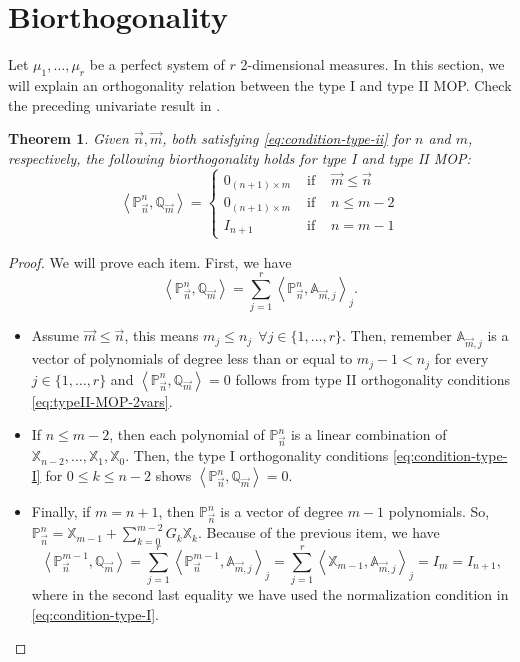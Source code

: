 \documentclass[12pt,a4]{article}
\theoremstyle{plain}
\newtheorem{theorem}{Theorem}[section]
\newcommand{\prodesc}[2]{\left\langle #1 , #2 \right\rangle}
\begin{document}
\section{Biorthogonality}

Let $\mu_1,\dots,\mu_r$ be a perfect system of $r$ 2-dimensional measures. In this section, we will explain an orthogonality relation between the type I and type II MOP. Check the preceding univariate result in \cite[Theorem 23.1.6]{Ismail}.

\begin{theorem}
    \label{th:biorthogonality}
    Given $\vec n, \vec m$, both satisfying \eqref{eq:condition-type-ii} for $n$ and $m$, respectively, the following biorthogonality holds for type I and type II MOP:
    \begin{equation}
        \prodesc{\mathbb P_{\vec n}^n}{\mathbb Q_{\vec m}} = \left\{\begin{array}{ccl}
            0_{(n+1)\times m} &   \text{ if } & \vec m \leq \vec n \\
            0_{(n+1)\times m} &   \text{ if } &  n \leq m -2 \\
            I_{n+1} & \text{ if } & n=m-1 
        \end{array}\right.   
    \end{equation}
\end{theorem}
\begin{proof}
    We will prove each item. First, we have
    \begin{equation*}
        \prodesc{\mathbb P_{\vec n}^n}{\mathbb Q_{\vec m}} = \sum_{j=1}^r \prodesc{\mathbb{P}_{\vec n}^n}{\mathbb A_{\vec m, j}}_j.
    \end{equation*}
    \begin{itemize}
        \item Assume $\vec m \leq \vec n$, this means $m_j \leq n_j \ \ \forall j\in\{1,\dots,r\}$. Then, remember $\mathbb{A}_{\vec m,j}$ is a vector of polynomials of degree less than or equal to $m_j-1 < n_j$ for every $j\in\{1,\dots,r\}$ and $\prodesc{\mathbb P_{\vec n}^n}{\mathbb Q_{\vec m}} =0$ follows from type II orthogonality conditions \eqref{eq:typeII-MOP-2vars}.
        \item  If $n\leq m-2$, then each polynomial of $\mathbb P_{\vec n}^n$ is a linear combination of $\mathbb X_{n-2},\dots,\mathbb X_1,\mathbb X_0$. Then, the type I orthogonality conditions \eqref{eq:condition-type-I} for $0\leq k\leq n-2$ shows $\prodesc{\mathbb P_{\vec n}^n}{\mathbb Q_{\vec m}} =0$.
        \item Finally, if $m=n+1$, then $\mathbb P_{\vec n}^n$ is a vector of degree $m-1$ polynomials. So, $\mathbb P_{\vec n}^n = \mathbb X_{m-1} + \displaystyle\sum_{k=0}^{m-2} G_{k} \mathbb X_{k}$. Because of the previous item, we have
        $$
        \prodesc{\mathbb P_{\vec n}^{m-1}}{\mathbb Q_{\vec m}} = \sum_{j=1}^r \prodesc{\mathbb{P}_{\vec n}^{m-1}}{\mathbb A_{\vec m, j}}_j = \sum_{j=1}^r \prodesc{\mathbb X_{m-1}}{\mathbb A_{\vec m, j}}_j = I_m = I_{n+1},
        $$
        where in the second last equality we have used the normalization condition in \eqref{eq:condition-type-I}.
    \end{itemize}
\end{proof}
\end{document}
